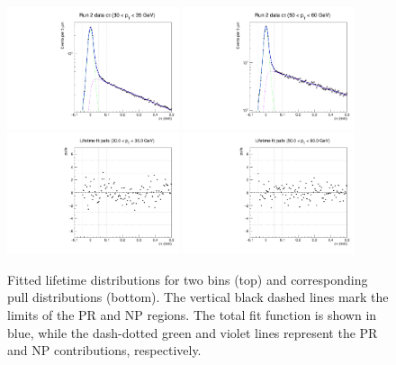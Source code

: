 \begin{figure}[p!]
\centering
\includegraphics[width=0.45\textwidth]{Figures/chapter4/ltfit_psip_pt2.pdf}
\includegraphics[width=0.45\textwidth]{Figures/chapter4/ltfit_psip_pt5.pdf}\\
\includegraphics[width=0.45\textwidth]{Figures/chapter4/pulls_ltfit_psip_pt2.pdf}
\includegraphics[width=0.45\textwidth]{Figures/chapter4/pulls_ltfit_psip_pt5.pdf}
\caption{Fitted \psip lifetime distributions for two \pt bins (top) 
and corresponding pull distributions (bottom).
The vertical black dashed lines mark the limits of the PR and NP regions. 
The total fit function is shown in blue, 
while the dash-dotted green and violet lines 
represent the PR and NP contributions, respectively.}
\label{fig:ctau-fits-psip}
\end{figure}

